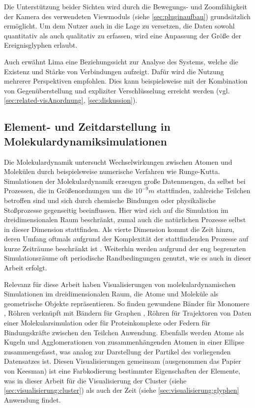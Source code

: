Die Unterstützung beider Sichten wird durch die Bewegungs- und Zoomfähigkeit der Kamera des verwendeten  Viewmoduls (siehe \autoref{sec:pluginaufbau}) grundsätzlich ermöglicht. Um dem Nutzer auch in die Lage zu versetzen, die Daten sowohl quantitativ als auch qualitativ zu erfassen, wird eine Anpassung der Größe der Ereignisglyphen erlaubt.

Auch erwähnt Lima eine Beziehungssicht zur Analyse des Systems, welche die Existenz und Stärke von Verbindungen aufzeigt. Dafür wird die Nutzung mehrerer Perspektiven empfohlen. Dies kann beispielsweise mit der Kombination von Gegenüberstellung und expliziter Verschlüsselung erreicht werden (vgl. \autoref{sec:related-visAnordnung}, \autoref{sec:diskussion}). %

\subsection*{Element- und Zeitdarstellung in Molekulardynamiksimulationen}

Die Molekulardynamik untersucht Wechselwirkungen zwischen Atomen und Molekülen durch beispielsweise numerische Verfahren wie Runge-Kutta. Simulationen der Molekulardynamik erzeugen große Datenmengen, da selbst bei Prozessen, die in Größenordnungen um die $10^{-9}m$ stattfinden, zahlreiche Teilchen betroffen sind und sich durch chemische Bindungen oder physikalische Stoßprozesse gegenseitig beeinflussen. Hier wird sich auf die Simulation im dreidimensionalen Raum beschränkt, zumal auch die natürlichen Prozesse selbst in dieser Dimension stattfinden. Als vierte Dimension kommt die Zeit hinzu, deren Umfang oftmals aufgrund der Komplexität der stattfindenden Prozesse auf kurze Zeiträume beschränkt ist \cite{bylaska2013extendingTimeMD}. Weiterhin werden aufgrund der eng begrenzten Simulationsräume oft periodische Randbedingungen genutzt, wie es auch in dieser Arbeit erfolgt. %

Relevanz für diese Arbeit haben Visualisierungen von molekulardynamischen Simulationen im dreidimensionalen Raum, die Atome und Moleküle als geometrische Objekte repräsentieren. So finden gewundene Bänder für Monomere \cite{cohen2007proteins}, Röhren verknüpft mit Bändern für Graphen \cite{sathe2011graphene}, Röhren für Trajektoren von Daten einer Molekularsimulation \cite{grottel2014trajectories} oder für Proteinkomplexe \cite{small2013ribosomal} \cite{cao2013cancer} oder Federn für Bindungskräfte zwischen den Teilchen \cite{keesman2013springs} \cite{mcBride2013pathIntegral_web} Anwendung. Ebenfalls werden \cite{vis07grottel} Atome als Kugeln und Agglomerationen von zusammenhängenden Atomen in einer Ellipse zusammengefasst, was analog zur Darstellung der Partikel des vorliegenden Datensatzes ist. Diesen Visualisierungen gemeinsam (ausgenommen das Papier von Keesman) ist eine Farbkodierung bestimmter Eigenschaften der Elemente, was in dieser Arbeit für die Visualisierung der Cluster (siehe \autoref{sec:visualisierung:cluster}) als auch der Zeit (siehe \autoref{sec:visualisierung:glyphen} Anwendung findet.

